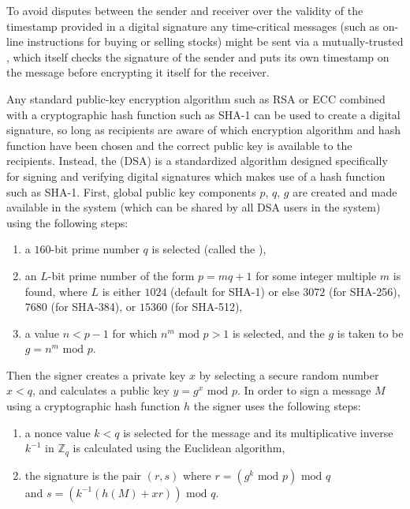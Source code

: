 To avoid disputes between the sender and receiver over the validity of the timestamp
provided in a digital signature any time-critical messages (such as on-line instructions
for buying or selling stocks) might be sent via a mutually-trusted ,
which itself checks the signature of the sender and puts its own timestamp on the
message before encrypting it itself for the receiver.

Any standard public-key encryption algorithm such as RSA or ECC combined with
a cryptographic hash function such as SHA-1 can be used to create a digital signature,
so long as recipients are aware of which encryption algorithm and hash function
have been chosen and the correct public key is available to the recipients.
Instead, the  (DSA) is a standardized algorithm
designed specifically for signing and verifying digital signatures which makes
use of a hash function such as SHA-1.
First, global public key components $p$, $q$, $g$ are created and made available
in the system (which can be shared by all DSA users in the system) using the following steps:
\begin{enumerate}
  \item a $160$-bit prime number $q$ is selected (called the ),
  \item an $L$-bit prime number of the form $p=mq+1$ for some integer multiple $m$ is found,
  where $L$ is either $1024$ (default for SHA-1) or else $3072$ (for SHA-256),
  $7680$ (for SHA-384), or $15360$ (for SHA-512),
  \item a value $n<p-1$ for which $n^m\mbox{ mod }p > 1$ is selected,
  and the  $g$ is taken to be $g=n^m\mbox{ mod }p$.
\end{enumerate}
Then the signer creates a private key $x$ by selecting a secure random number $x<q$,
and calculates a public key $y=g^x\mbox{ mod }p$.
In order to sign a message $M$ using a cryptographic hash function $h$ the signer
uses the following steps:
\begin{enumerate}
  \item a nonce value $k<q$ is selected for the message and its multiplicative inverse
  $k^{-1}$ in $\mathbb{Z}_q$ is calculated using the Euclidean algorithm,
  \item the signature is the pair $(r,s)$ where $r=\left(g^k\mbox{ mod }p\right)\textrm{ mod }q$\\ and $s=\left(k^{-1}\left(h(M)+xr\right)\right)\mbox{ mod }q$.
\end{enumerate}
